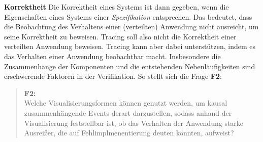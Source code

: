 \textbf{Korrektheit} \space\space\space Die Korrektheit eines Systems ist dann gegeben, wenn die Eigenschaften eines Systems einer \emph{Spezifikation} entsprechen. Das bedeutet, dass die Beobachtung des Verhaltens einer (verteilten) Anwendung nicht ausreicht, um seine Korrektheit zu beweisen. Tracing soll also nicht die Korrektheit einer verteilten Anwendung beweisen. Tracing kann aber dabei unterstützen, indem es das Verhalten einer Anwendung beobachtbar macht. Insbesondere die Zusammenhänge der Komponenten und die entstehenden Nebenläufigkeiten sind erschwerende Faktoren in der Verifikation. So stellt sich die Frage \textbf{F2}:

\begin{quote}
	\cbstart
	\textbf{F2:}\\
	Welche Visualisierungsformen können genutzt werden, um kausal zusammenhängende Events derart darzustellen, sodass anhand der Visualisierung feststellbar ist, ob das Verhalten der Anwendung starke Ausreißer, die auf Fehlimplmenentierung deuten könnten, aufweist?
	\cbend
\end{quote}

